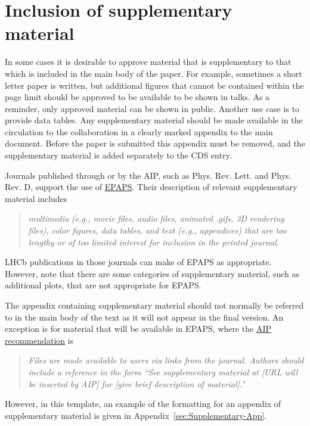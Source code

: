 \section{Inclusion of supplementary material}
\label{sec:Supplementary}

In some cases it is desirable to approve material that is
supplementary to that which is included in the main body of the paper.
For example, sometimes a short letter paper is written, but additional
figures that cannot be contained within the page limit should be
approved to be available to be shown in talks. As a reminder, only
approved material can be shown in public. Another use case is to
provide data tables.  Any supplementary material should be made
available in the circulation to the collaboration in a clearly marked
appendix to the main document.  Before the paper is submitted this
appendix must be removed, and the supplementary material is added
separately to the CDS entry.

Journals published through or by the AIP, such as Phys. Rev. Lett. and
Phys. Rev. D, support the use of
\href{http://www.aip.org/pubservs/epaps.html}{EPAPS}.  Their
description of relevant supplementary material includes
\begin{quote} {\it multimedia (e.g., movie files, audio files,
    animated .gifs, 3D rendering files), color figures, data tables,
    and text (e.g., appendices) that are too lengthy or of too limited
    interest for inclusion in the printed journal}.
\end{quote}
LHCb publications in those journals can make of EPAPS as appropriate.
However, note that there are some categories of supplementary
material, such as additional plots, that are not appropriate for
EPAPS.

The appendix containing supplementary material should not normally be
referred to in the main body of the text as it will not appear in
the final version.  An exception is for material that will be
available in EPAPS, where the
\href{http://www.aip.org/epaps/how_epaps_works.html#deposit}{AIP
  recommendation} is
\begin{quote} {\it Files are made available to users via links from
    the journal. Authors should include a reference in the form ``See
    supplementary material at [URL will be inserted by AIP] for [give
    brief description of material].''}
\end{quote}
However, in this template, an example of the formatting for an appendix
of supplementary material is given in
Appendix~\ref{sec:Supplementary-App}.
